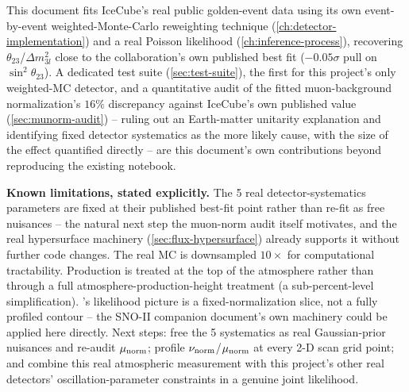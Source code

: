This document fits IceCube's real public golden-event data using its own
event-by-event weighted-Monte-Carlo reweighting technique
(\cref{ch:detector-implementation}) and a real Poisson likelihood
(\cref{ch:inference-process}), recovering $\theta_{23}$/$\Delta m^2_{3l}$
close to the collaboration's own published best fit ($-0.05\sigma$ pull on
$\sin^2\theta_{23}$). A dedicated test suite
(\cref{sec:test-suite}), the first for this project's only weighted-MC
detector, and a quantitative audit of the fitted muon-background
normalization's $16\%$ discrepancy against IceCube's own published value
(\cref{sec:munorm-audit}) -- ruling out an Earth-matter unitarity
explanation and identifying fixed detector systematics as the more likely
cause, with the size of the effect quantified directly -- are this
document's own contributions beyond reproducing the existing notebook.

\begin{notebox}
\textbf{Known limitations, stated explicitly.} The 5 real
detector-systematics parameters are fixed at their published best-fit
point rather than re-fit as free nuisances -- the natural next step the
muon-norm audit itself motivates, and the real hypersurface machinery
(\cref{sec:flux-hypersurface}) already supports it without further code
changes. The real MC is downsampled $10\times$ for computational
tractability. Production is treated at the top of the atmosphere rather
than through a full atmosphere-production-height treatment (a
sub-percent-level simplification). 's likelihood
picture is a fixed-normalization slice, not a fully profiled contour --
the SNO-II companion document's own  machinery
could be applied here directly. Next steps: free the 5 systematics as
real Gaussian-prior nuisances and re-audit $\mu_{\rm norm}$; profile
$\nu_{\rm norm}$/$\mu_{\rm norm}$ at every 2-D scan grid point; and
combine this real atmospheric measurement with this project's other real
detectors' oscillation-parameter constraints in a genuine joint
likelihood.
\end{notebox}

